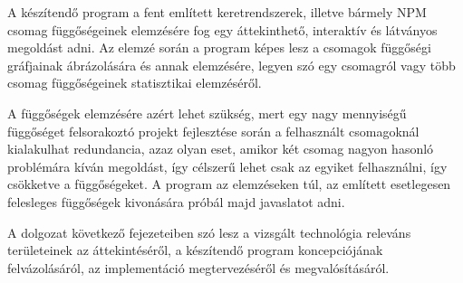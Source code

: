 A készítendő program a fent említett keretrendszerek, illetve bármely NPM csomag függőségeinek elemzésére fog egy áttekinthető, interaktív és látványos megoldást adni. Az elemzé során a program képes lesz a csomagok függőségi gráfjainak ábrázolására és annak elemzésére, legyen szó egy csomagról vagy több csomag függőségeinek statisztikai elemzéséről.

A függőségek elemzésére azért lehet szükség, mert egy nagy mennyiségű függőséget felsorakoztó projekt fejlesztése során a felhasznált csomagoknál kialakulhat redundancia, azaz olyan eset, amikor két csomag nagyon hasonló problémára kíván megoldást, így célszerű lehet csak az egyiket felhasználni, így csökketve a függőségeket. A program az elemzéseken túl, az említett esetlegesen felesleges függőségek kivonására próbál majd javaslatot adni.

A dolgozat következő fejezeteiben szó lesz a vizsgált technológia releváns területeinek az áttekintéséről, a készítendő program koncepciójának felvázolásáról, az implementáció megtervezéséről és megvalósításáról.

